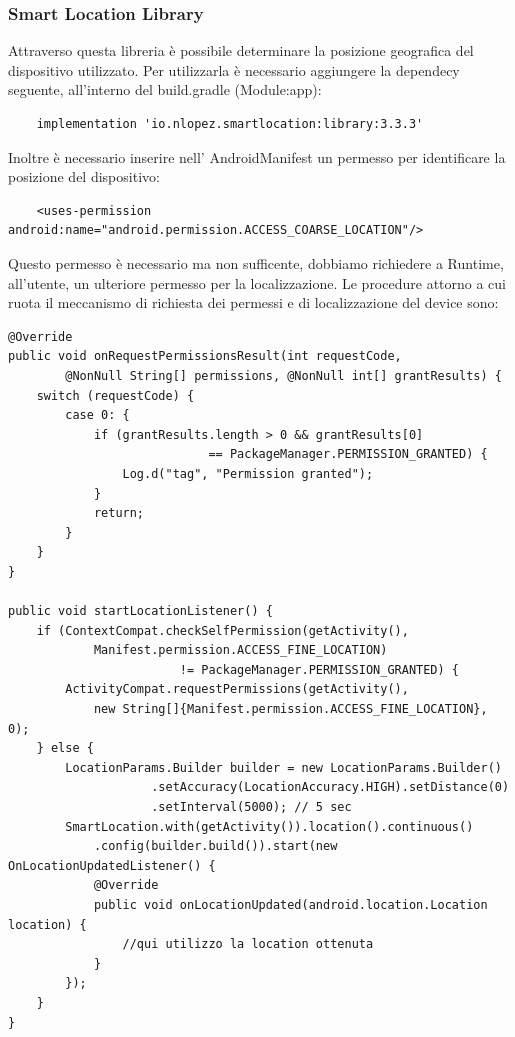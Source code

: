 \documentclass{article}
\begin{document}
\subsubsection{Smart Location Library}
Attraverso questa libreria è possibile determinare la posizione geografica del dispositivo utilizzato. Per utilizzarla è necessario aggiungere la
dependecy seguente, all'interno del build.gradle (Module:app):
\begin{lstlisting}
    implementation 'io.nlopez.smartlocation:library:3.3.3'
\end{lstlisting}
Inoltre è necessario inserire nell' AndroidManifest un permesso per identificare la posizione del dispositivo:
\begin{lstlisting}
    <uses-permission android:name="android.permission.ACCESS_COARSE_LOCATION"/>
\end{lstlisting}
Questo permesso è necessario ma non sufficente, dobbiamo richiedere a Runtime, all'utente, un ulteriore permesso
per la localizzazione. Le procedure attorno a cui ruota il meccanismo di richiesta dei permessi
e di localizzazione del device sono:
\begin{lstlisting}
@Override
public void onRequestPermissionsResult(int requestCode,
        @NonNull String[] permissions, @NonNull int[] grantResults) {
    switch (requestCode) {
        case 0: {
            if (grantResults.length > 0 && grantResults[0] 
                            == PackageManager.PERMISSION_GRANTED) {
                Log.d("tag", "Permission granted");
            }
            return;
        }
    }
}

public void startLocationListener() {
    if (ContextCompat.checkSelfPermission(getActivity(),
            Manifest.permission.ACCESS_FINE_LOCATION) 
                        != PackageManager.PERMISSION_GRANTED) {
        ActivityCompat.requestPermissions(getActivity(), 
            new String[]{Manifest.permission.ACCESS_FINE_LOCATION}, 0);
    } else {
        LocationParams.Builder builder = new LocationParams.Builder()
                    .setAccuracy(LocationAccuracy.HIGH).setDistance(0)
                    .setInterval(5000); // 5 sec
        SmartLocation.with(getActivity()).location().continuous()
            .config(builder.build()).start(new OnLocationUpdatedListener() {
            @Override
            public void onLocationUpdated(android.location.Location location) {
                //qui utilizzo la location ottenuta
            }
        });
    }
}
\end{lstlisting}
\end{document}
